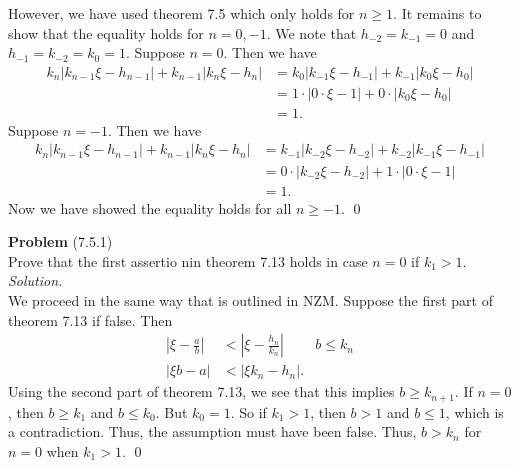 \documentclass[12 pt]{amsart}
\begin{document}
  However, we have used theorem 7.5 which only holds for $n \geq 1$.
  It remains to show that the equality holds for $n = 0, -1$.
  We note that $h_{-2} = k_{-1} = 0$ and $h_{-1} = k_{-2} = k_0 = 1$.
  Suppose $n = 0$. 
  Then we have
  \begin{align*}
    k_n | k_{n-1} \xi - h_{n-1} |
    + k_{n-1} |k_n \xi - h_n |
    &=
      k_0 | k_{-1} \xi - h_{-1} |
      + k_{-1} |k_0 \xi - h_0 | \\
    &=
      1 \cdot | 0 \cdot \xi - 1 |
      + 0 \cdot |k_0 \xi - h_0 | \\
    &=
      1.
  \end{align*}
  Suppose $n = -1$. 
  Then we have
  \begin{align*}
    k_n | k_{n-1} \xi - h_{n-1} |
    + k_{n-1} |k_n \xi - h_n |
    &=
      k_{-1} | k_{-2} \xi - h_{-2} |
      + k_{-2} |k_{-1} \xi - h_{-1} | \\
    &=
      0 \cdot | k_{-2} \xi - h_{-2} |
      + 1 \cdot |0 \cdot \xi - 1 | \\
    &=
      1.
  \end{align*}
  Now we have showed the equality holds for all $n \geq -1$.
  \qed
\vfill
\newpage



\phantom{\quad} \vfill
\noindent
\textbf{Problem} (7.5.1) \\[4ex]
  Prove that the first assertio nin theorem 7.13 holds in case
  $n = 0$ if $k_1 > 1$.
  \\[2ex]
\emph{Solution.} \\[2ex]
  We proceed in the same way that is outlined in NZM.
  Suppose the first part of theorem 7.13 if false. 
  Then 
  \begin{align*}
    \left| \xi - \frac{a}{b} \right| 
    &< 
    \left| \xi - \frac{h_n}{k_n} \right|  & b\leq k_n\\
    | \xi b - a | &< | \xi k_n - h_n |.
  \end{align*}
  Using the second part of theorem 7.13, we see that 
  this implies
  $b \geq k_{n+1}$.
  If $n = 0$, then $b \geq k_1$ and $b \leq k_0$.
  But $k_0 = 1$. 
  So if $k_1 > 1$, then $b > 1$ and $b \leq 1$, which
  is a contradiction.
  Thus, the assumption must have been false. 
  Thus, $b > k_n$ for $n = 0$ when $k_1 > 1$.
  \qed
\vfill
\newpage
\end{document}

